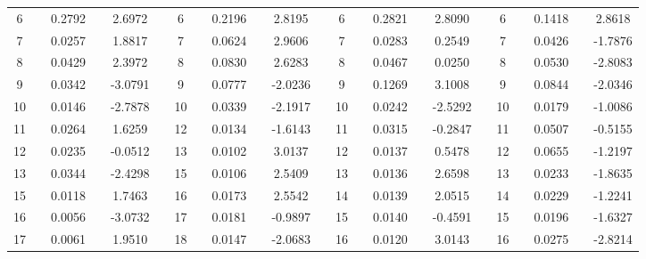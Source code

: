 \documentclass[12pt,halfline,a4paper]{ouparticle}
\begin{document}
\begin{table}
{\begin{tabular}{ccccccccccccccccccccccc}
			6     &       & 0.2792 &       & 2.6972 &       & 6     &       & 0.2196 &       & 2.8195 &       & 6     &       & 0.2821 &       & 2.8090 &       & 6     &       & 0.1418 &       & 2.8618 \\
			7     &       & 0.0257 &       & 1.8817 &       & 7     &       & 0.0624 &       & 2.9606 &       & 7     &       & 0.0283 &       & 0.2549 &       & 7     &       & 0.0426 &       & -1.7876 \\
			8     &       & 0.0429 &       & 2.3972 &       & 8     &       & 0.0830 &       & 2.6283 &       & 8     &       & 0.0467 &       & 0.0250 &       & 8     &       & 0.0530 &       & -2.8083 \\
			9     &       & 0.0342 &       & -3.0791 &       & 9     &       & 0.0777 &       & -2.0236 &       & 9     &       & 0.1269 &       & 3.1008 &       & 9     &       & 0.0844 &       & -2.0346 \\
			10    &       & 0.0146 &       & -2.7878 &       & 10    &       & 0.0339 &       & -2.1917 &       & 10    &       & 0.0242 &       & -2.5292 &       & 10    &       & 0.0179 &       & -1.0086 \\
			11    &       & 0.0264 &       & 1.6259 &       & 12    &       & 0.0134 &       & -1.6143 &       & 11    &       & 0.0315 &       & -0.2847 &       & 11    &       & 0.0507 &       & -0.5155 \\
			12    &       & 0.0235 &       & -0.0512 &       & 13    &       & 0.0102 &       & 3.0137 &       & 12    &       & 0.0137 &       & 0.5478 &       & 12    &       & 0.0655 &       & -1.2197 \\
			13    &       & 0.0344 &       & -2.4298 &       & 15    &       & 0.0106 &       & 2.5409 &       & 13    &       & 0.0136 &       & 2.6598 &       & 13    &       & 0.0233 &       & -1.8635 \\
			15    &       & 0.0118 &       & 1.7463 &       & 16    &       & 0.0173 &       & 2.5542 &       & 14    &       & 0.0139 &       & 2.0515 &       & 14    &       & 0.0229 &       & -1.2241 \\
			16    &       & 0.0056 &       & -3.0732 &       & 17    &       & 0.0181 &       & -0.9897 &       & 15    &       & 0.0140 &       & -0.4591 &       & 15    &       & 0.0196 &       & -1.6327 \\
			17    &       & 0.0061 &       & 1.9510 &       & 18    &       & 0.0147 &       & -2.0683 &       & 16    &       & 0.0120 &       & 3.0143 &       & 16    &       & 0.0275 &       & -2.8214 \\

\end{tabular}}
\end{table}
\end{document}
